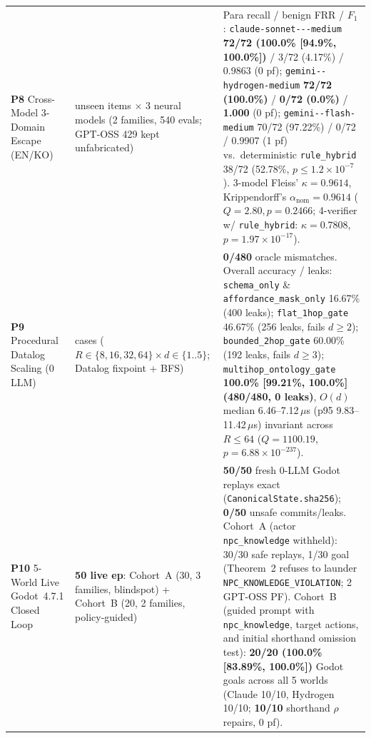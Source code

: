 \begin{table}[!tbp]
\begin{tabularx}{\textwidth}{@{}>{\raggedright\arraybackslash}p{}>{\raggedright\arraybackslash}p{}>{\raggedright\arraybackslash}X@{}}
\textbf{P8} Cross-Model 3-Domain Escape (EN/KO) & 180 unseen items $\times$ 3 neural models (2 families, 540 evals; GPT-OSS 429 kept unfabricated) & Para recall / benign FRR / $F_1$: \texttt{claude-\allowbreak sonnet-\allowbreak 5-\allowbreak 5-\allowbreak medium} \textbf{72/72 (100.0\% [94.9\%, 100.0\%])} / 3/72 (4.17\%) / 0.9863 (0 pf); \texttt{gemini-\allowbreak 4-\allowbreak hydrogen-\allowbreak medium} \textbf{72/72 (100.0\%)} / \textbf{0/72 (0.0\%)} / \textbf{1.000} (0 pf); \texttt{gemini-\allowbreak 3.8-\allowbreak flash-\allowbreak medium} 70/72 (97.22\%) / 0/72 / 0.9907 (1 pf) vs.\ deterministic \texttt{rule\_hybrid} 38/72 (52.78\%, $p{\le}1.2{\times}10^{-7}$). 3-model Fleiss' $\kappa{=}\mathbf{0.9614}$, Krippendorff's $\alpha_{\mathrm{nom}}{=}\mathbf{0.9614}$ ($Q{=}2.80, p{=}0.2466$; 4-verifier w/ \texttt{rule\_hybrid}: $\kappa{=}0.7808$, $p{=}1.97{\times}10^{-17}$). \\
\textbf{P9} Procedural Datalog Scaling (0 LLM) & 480 cases ($R{\in}\{8,16,32,64\} \times d{\in}\{1..5\}$; Datalog fixpoint + BFS) & \textbf{0/480} oracle mismatches. Overall accuracy / leaks: \texttt{schema\_only} \& \texttt{affordance\_}\allowbreak\texttt{mask\_only} 16.67\% (400 leaks); \texttt{flat\_}\allowbreak\texttt{1hop\_}\allowbreak\texttt{gate} 46.67\% (256 leaks, fails $d{\ge}2$); \texttt{bounded\_}\allowbreak\texttt{2hop\_}\allowbreak\texttt{gate} 60.00\% (192 leaks, fails $d{\ge}3$); \texttt{multihop\_}\allowbreak\texttt{ontology\_}\allowbreak\texttt{gate} \textbf{100.0\% [99.21\%, 100.0\%] (480/480, 0 leaks)}, $O(d)$ median 6.46--7.12\,$\mu$s (p95 9.83--11.42\,$\mu$s) invariant across $R{\le}64$ ($Q{=}1100.19$, $p{=}6.88{\times}10^{-237}$). \\
\textbf{P10} 5-World Live Godot~4.7.1 Closed Loop & \textbf{50 live ep}: Cohort~A (30, 3 families, blindspot) + Cohort~B (20, 2 families, policy-guided) & \textbf{50/50} fresh 0-LLM Godot replays exact (\texttt{CanonicalState.sha256}); \textbf{0/50} unsafe commits/leaks. Cohort~A (actor \texttt{npc\_knowledge} withheld): 30/30 safe replays, 1/30 goal (Theorem~2 refuses to launder \texttt{NPC\_}\allowbreak\texttt{KNOWLEDGE\_}\allowbreak\texttt{VIOLATION}; 2 GPT-OSS PF). Cohort~B (guided prompt with \texttt{npc\_knowledge}, target actions, and initial shorthand omission test): \textbf{20/20 (100.0\% [83.89\%, 100.0\%])} Godot goals across all 5 worlds (Claude 10/10, Hydrogen 10/10; \textbf{10/10} shorthand $\rho$ repairs, 0 pf). \\
\bottomrule
\end{tabularx}
\end{table}


